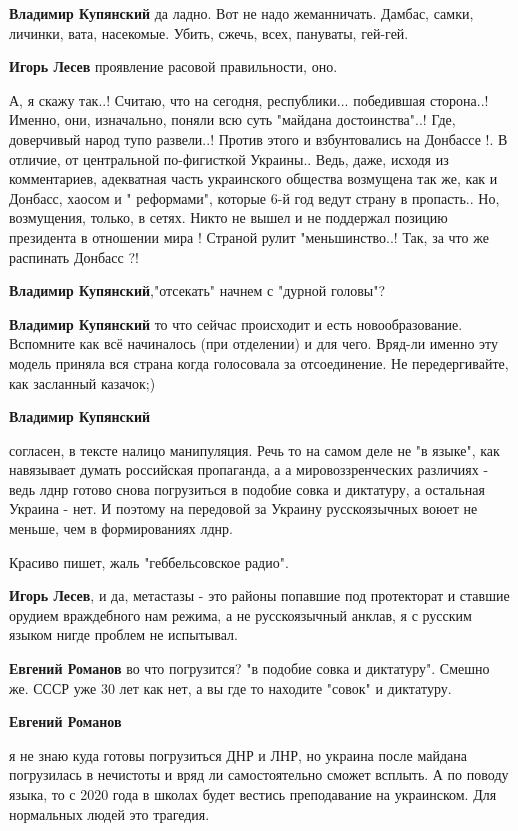 \begin{itemize}
\begin{itemize}
\textbf{Владимир Купянский} да ладно. Вот не надо жеманничать. Дамбас, самки, личинки, вата, насекомые. Убить, сжечь, всех, пануваты, гей-гей.

\textbf{Игорь Лесев} проявление расовой правильности, оно.


А, я скажу так..! Считаю, что на сегодня, республики... победившая сторона..!
Именно, они, изначально, поняли всю суть "майдана достоинства"..! Где,
доверчивый народ тупо развели..! Против этого и взбунтовались на Донбассе !. В
отличие, от центральной по-фигисткой Украины.. Ведь, даже, исходя из
комментариев, адекватная часть украинского общества возмущена так же, как и
Донбасс, хаосом и " реформами", которые 6-й год ведут страну в пропасть.. Но,
возмущения, только, в сетях. Никто не вышел и не поддержал позицию президента в
отношении мира ! Страной рулит "меньшинство..! Так, за что же распинать Донбасс
?!

\textbf{Владимир Купянский},"отсекать" начнем с "дурной головы"?

\textbf{Владимир Купянский} то что сейчас происходит и есть новообразование. Вспомните как всё начиналось (при отделении) и для чего. Вряд-ли именно эту модель приняла вся страна когда голосовала за отсоединение. Не передергивайте, как засланный казачок;)

\textbf{Владимир Купянский} 

согласен, в тексте налицо манипуляция. Речь то на самом деле не "в языке", как
навязывает думать российская пропаганда, а а мировоззренческих различиях -
ведь лднр готово снова погрузиться в подобие совка и диктатуру, а остальная
Украина - нет. И поэтому на передовой за Украину русскоязычных воюет не меньше,
чем в формированиях лднр.

Красиво пишет, жаль "геббельсовское радио".

\textbf{Игорь Лесев}, и да, метастазы - это районы попавшие под протекторат и ставшие
орудием враждебного нам режима, а не русскоязычный анклав, я с русским языком
нигде проблем не испытывал.


\textbf{Евгений Романов} во что погрузится? "в подобие совка и диктатуру". Смешно же. СССР уже 30 лет как нет, а вы где то находите "совок" и диктатуру.

\textbf{Евгений Романов} 

я не знаю куда готовы погрузиться ДНР и ЛНР, но украина после майдана
погрузилась в нечистоты и вряд ли самостоятельно сможет всплыть. А по поводу
языка, то с 2020 года в школах будет вестись преподавание на украинском. Для
нормальных людей это трагедия.


\end{itemize}
\end{itemize}
